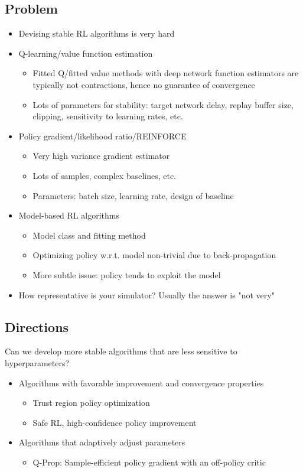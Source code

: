 \subsection{Problem}
\begin{itemize}
	\item Devising stable RL algorithms is very hard
	\item Q-learning/value function estimation
	\begin{itemize}
		\item Fitted Q/fitted value methods with deep network function estimators are typically not contractions, hence no guarantee of convergence
		\item Lots of parameters for stability: target network delay, replay buffer size, clipping, sensitivity to learning rates, etc.
	\end{itemize}	
	\item Policy gradient/likelihood ratio/REINFORCE
	\begin{itemize}
		\item Very high variance gradient estimator
		\item Lots of samples, complex baselines, etc.
		\item Parameters: batch size, learning rate, design of baseline
	\end{itemize}	
	\item Model-based RL algorithms
	\begin{itemize}
		\item Model class and fitting method
		\item Optimizing policy w.r.t. model non-trivial due to back-propagation
		\item More subtle issue: policy tends to exploit the model
	\end{itemize}
	\item How representative is your simulator? Usually the answer is "not very"
\end{itemize}
\subsection{Directions}
Can we develop more stable algorithms that are less sensitive to hyperparameters?
\begin{itemize}
	\item Algorithms with favorable improvement and convergence properties
	\begin{itemize}
		\item Trust region policy optimization \cite{schulman2015icml}
		\item Safe \ac{RL}, high-confidence policy improvement
	\end{itemize}
	\item Algorithms that adaptively adjust parameters
	\begin{itemize}
		\item Q-Prop: Sample-efficient policy gradient with an off-policy critic \cite{gu2016q}
	\end{itemize}
\end{itemize}

